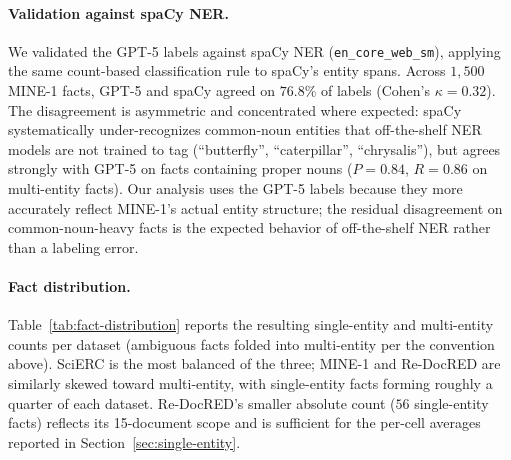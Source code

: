 \documentclass[11pt]{article}
\begin{document}
\paragraph{Validation against spaCy NER.} We validated the GPT-5 labels against spaCy NER (\texttt{en\_core\_web\_sm}), applying the same count-based classification rule to spaCy's entity spans. Across $1{,}500$ MINE-1 facts, GPT-5 and spaCy agreed on $76.8\%$ of labels (Cohen's $\kappa = 0.32$). The disagreement is asymmetric and concentrated where expected: spaCy systematically under-recognizes common-noun entities that off-the-shelf NER models are not trained to tag (``butterfly'', ``caterpillar'', ``chrysalis''), but agrees strongly with GPT-5 on facts containing proper nouns ($P{=}0.84$, $R{=}0.86$ on multi-entity facts). Our analysis uses the GPT-5 labels because they more accurately reflect MINE-1's actual entity structure; the residual disagreement on common-noun-heavy facts is the expected behavior of off-the-shelf NER rather than a labeling error.

\paragraph{Fact distribution.} Table~\ref{tab:fact-distribution} reports the resulting single-entity and multi-entity counts per dataset (ambiguous facts folded into multi-entity per the convention above). SciERC is the most balanced of the three; MINE-1 and Re-DocRED are similarly skewed toward multi-entity, with single-entity facts forming roughly a quarter of each dataset. Re-DocRED's smaller absolute count ($56$ single-entity facts) reflects its 15-document scope and is sufficient for the per-cell averages reported in Section~\ref{sec:single-entity}.
\end{document}
